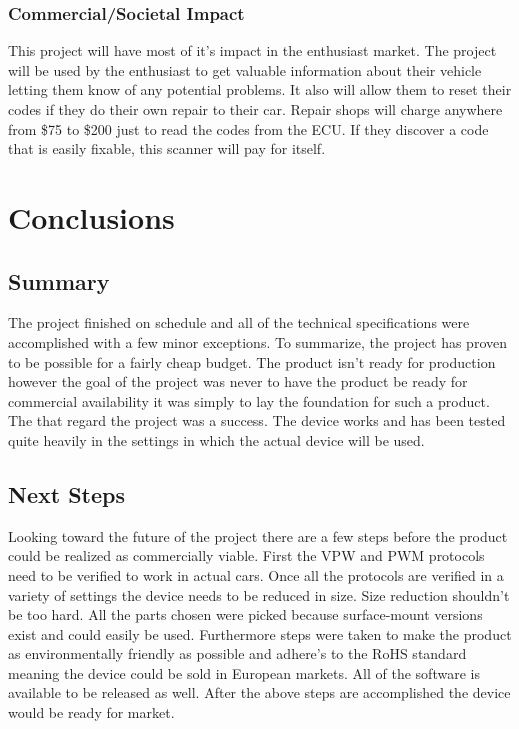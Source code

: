 \documentclass[12pt,letterpaper]{article}
\begin{document}
\subsubsection{Commercial/Societal Impact}
This project will have most of it's impact in the enthusiast market. The project will be used by the enthusiast to get valuable information about their vehicle letting them know of any potential problems. It also will allow them to reset their codes if they do their own repair to their car. Repair shops will charge anywhere from \$75 to \$200 just to read the codes from the ECU. If they discover a code that is easily fixable, this scanner will pay for itself.

\newpage

\section{Conclusions}
\subsection{Summary}
The project finished on schedule and all of the technical specifications were accomplished with a few minor exceptions. To summarize, the project has proven to be possible for a fairly cheap budget. The product isn't ready for production however the goal of the project was never to have the product be ready for commercial availability it was simply to lay the foundation for such a product. The that regard the project was a success. The device works and has been tested quite heavily in the settings in which the actual device will be used.

\subsection{Next Steps}
Looking toward the future of the project there are a few steps before the product could be realized as commercially viable. First the VPW and PWM protocols need to be verified to work in actual cars. Once all the protocols are verified in a variety of settings the device needs to be reduced in size. Size reduction shouldn't be too hard. All the parts chosen were picked because surface-mount versions exist and could easily be used. Furthermore steps were taken to make the product as environmentally friendly as possible and adhere's to the RoHS standard meaning the device could be sold in European markets. All of the software is available to be released as well. After the above steps are accomplished the device would be ready for market.
\end{document}
